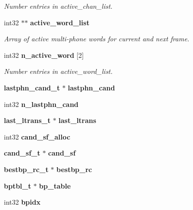 \begin{DoxyCompactItemize}
\begin{DoxyCompactList}\small\item\em Number entries in active\+\_\+chan\+\_\+list. \end{DoxyCompactList}\item 
int32 $\ast$$\ast$ {\bf active\+\_\+word\+\_\+list}
\begin{DoxyCompactList}\small\item\em Array of active multi-\/phone words for current and next frame. \end{DoxyCompactList}\item 
int32 {\bf n\+\_\+active\+\_\+word} [2]\label{structngram__search__s_a5c864f1fe331fc95c04e0d87a5bdf9ee}

\begin{DoxyCompactList}\small\item\em Number entries in active\+\_\+word\+\_\+list. \end{DoxyCompactList}\item 
{\bf lastphn\+\_\+cand\+\_\+t} $\ast$ {\bfseries lastphn\+\_\+cand}\label{structngram__search__s_a82d9662cfa82599617176eb5c4e5f15f}

\item 
int32 {\bfseries n\+\_\+lastphn\+\_\+cand}\label{structngram__search__s_ad8b16d4873706ca29a6e22e2143ae896}

\item 
{\bf last\+\_\+ltrans\+\_\+t} $\ast$ {\bfseries last\+\_\+ltrans}\label{structngram__search__s_a3f1429a7dd697c6537c353f172fea97f}

\item 
int32 {\bfseries cand\+\_\+sf\+\_\+alloc}\label{structngram__search__s_ae17322f484615fa7ecb2c40ebeceecd9}

\item 
{\bf cand\+\_\+sf\+\_\+t} $\ast$ {\bfseries cand\+\_\+sf}\label{structngram__search__s_a3304d30024b83107ed8e5e2dd770334b}

\item 
{\bf bestbp\+\_\+rc\+\_\+t} $\ast$ {\bfseries bestbp\+\_\+rc}\label{structngram__search__s_a8ab80281d54e9fa14a3631cb5b5e97a7}

\item 
{\bf bptbl\+\_\+t} $\ast$ {\bfseries bp\+\_\+table}\label{structngram__search__s_a44b5476f901d827d5e6a23a5aa11eb43}

\item 
int32 {\bfseries bpidx}\label{structngram__search__s_ad72007665bf21bb12261eb63c996a987}


\end{DoxyCompactItemize}
